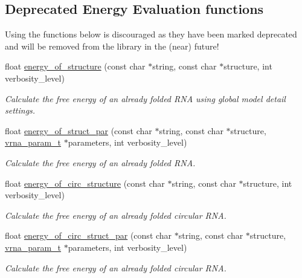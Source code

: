 \subsection*{Deprecated Energy Evaluation functions}
\label{_amgrp350f64f578ad95493f83500bcd6ab81f}%
Using the functions below is discouraged as they have been marked deprecated and will be removed from the library in the (near) future! \begin{DoxyCompactItemize}
\item 
float \mbox{\hyperlink{group__eval_gaf93986cb3cb29770ec9cca69c9fab8cf}{energy\+\_\+of\+\_\+structure}} (const char $\ast$string, const char $\ast$structure, int verbosity\+\_\+level)
\begin{DoxyCompactList}\small\item\em Calculate the free energy of an already folded R\+NA using global model detail settings. \end{DoxyCompactList}\item 
float \mbox{\hyperlink{group__eval_gaf9d064d3c496de42eca6734a96fd2090}{energy\+\_\+of\+\_\+struct\+\_\+par}} (const char $\ast$string, const char $\ast$structure, \mbox{\hyperlink{group__energy__parameters_ga8a69ca7d787e4fd6079914f5343a1f35}{vrna\+\_\+param\+\_\+t}} $\ast$parameters, int verbosity\+\_\+level)
\begin{DoxyCompactList}\small\item\em Calculate the free energy of an already folded R\+NA. \end{DoxyCompactList}\item 
float \mbox{\hyperlink{group__eval_gaeb14f3664aec67fc03268ac75253f0f8}{energy\+\_\+of\+\_\+circ\+\_\+structure}} (const char $\ast$string, const char $\ast$structure, int verbosity\+\_\+level)
\begin{DoxyCompactList}\small\item\em Calculate the free energy of an already folded circular R\+NA. \end{DoxyCompactList}\item 
float \mbox{\hyperlink{group__eval_ga3f01f9744ba6a40555eb4d81fc77f6df}{energy\+\_\+of\+\_\+circ\+\_\+struct\+\_\+par}} (const char $\ast$string, const char $\ast$structure, \mbox{\hyperlink{group__energy__parameters_ga8a69ca7d787e4fd6079914f5343a1f35}{vrna\+\_\+param\+\_\+t}} $\ast$parameters, int verbosity\+\_\+level)
\begin{DoxyCompactList}\small\item\em Calculate the free energy of an already folded circular R\+NA. \end{DoxyCompactList}\item 

\end{DoxyCompactItemize}
